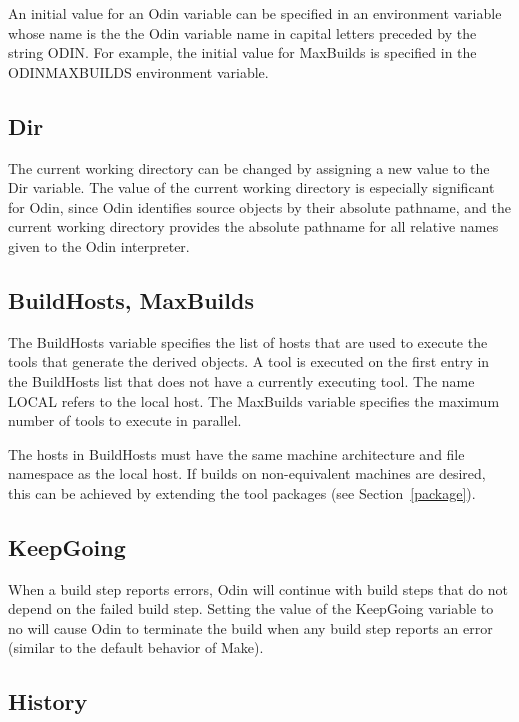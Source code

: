 An initial value for an Odin variable can be
specified in an environment variable whose name is the
the Odin variable name in capital letters preceded by the
string {\ex ODIN}.  For example, the initial value for {\ex MaxBuilds}
is specified in the {\ex ODINMAXBUILDS} environment variable.

\subsection{Dir}

The current working directory can be changed by assigning a new value
to the {\ex Dir} variable.
The value of the current working directory is especially significant for Odin,
since Odin identifies source objects by their absolute pathname,
and the current working directory provides the absolute pathname
for all relative names given to the Odin interpreter.

\subsection{BuildHosts, MaxBuilds}

The {\ex BuildHosts} variable specifies the list of hosts that are used to
execute the tools that generate the derived objects.
A tool is executed on the first entry in the {\ex BuildHosts}
list that does not have a currently executing tool.
The name {\ex LOCAL} refers to the local host.
The {\ex MaxBuilds} variable specifies the maximum number of tools
to execute in parallel.

The hosts in {\ex BuildHosts} must have
the same machine architecture and file namespace as the local host.
If builds on non-equivalent machines are desired,
this can be achieved by extending the tool packages
(see Section~\ref{package}).

\subsection{KeepGoing}
\label{keepgoing}

When a build step reports errors, Odin will continue with build
steps that do not depend on the failed build step.
Setting the value of the {\ex KeepGoing} variable to {\ex no}
will cause Odin to terminate the build when any build step
reports an error (similar to the default behavior of Make).

\subsection{History}
\label{history}

